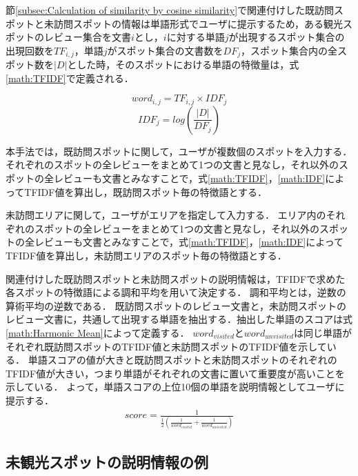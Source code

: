 \documentclass{deimj}
\begin{document}
節\ref{subsec:Calculation of similarity by cosine similarity}で関連付けした既訪問スポットと未訪問スポットの情報は単語形式でユーザに提示するため，ある観光スポットのレビュー集合を文書$i$とし，$i$に対する単語$j$が出現するスポット集合の出現回数を$TF_{i,j}$，単語$j$がスポット集合の文書数を$DF_{j}$，スポット集合内の全スポット数を$|D|$とした時，そのスポットにおける単語の特徴量は，式\ref{math:TFIDF}で定義される．

\begin{equation}
  word_{i,j} = TF_{i,j} \times IDF_{j}
  \label{math:TFIDF}
\end{equation}
\begin{equation}
  IDF_{j} = log(\frac{|D|}{DF_{j}})
  \label{math:IDF}
\end{equation}

本手法では，既訪問スポットに関して，ユーザが複数個のスポットを入力する．
それぞれのスポットの全レビューをまとめて1つの文書と見なし，それ以外のスポットの全レビューも文書とみなすことで，式\ref{math:TFIDF}，\ref{math:IDF}によってTFIDF値を算出し，既訪問スポット毎の特徴語とする．

未訪問エリアに関して，ユーザがエリアを指定して入力する．
エリア内のそれぞれのスポットの全レビューをまとめて1つの文書と見なし，それ以外のスポットの全レビューも文書とみなすことで，式\ref{math:TFIDF}，\ref{math:IDF}によってTFIDF値を算出し，未訪問エリアのスポット毎の特徴語とする．

関連付けした既訪問スポットと未訪問スポットの説明情報は，TFIDFで求めた各スポットの特徴語による調和平均を用いて決定する．
調和平均とは，逆数の算術平均の逆数である．
既訪問スポットのレビュー文書と，未訪問スポットのレビュー文書に，共通して出現する単語を抽出する．抽出した単語のスコアは式\ref{math:Harmonic Mean}によって定義する．
$word_{visited}$と$word_{unvisited}$は同じ単語がそれぞれ既訪問スポットのTFIDF値と未訪問スポットのTFIDF値を示している．
単語スコアの値が大きと既訪問スポットと未訪問スポットのそれぞれのTFIDF値が大きい，つまり単語がそれぞれの文書に置いて重要度が高いことを示している．
よって，単語スコアの上位10個の単語を説明情報としてユーザに提示する．
\begin{eqnarray}
  score=\frac{1}{\frac{1}{2}(\frac{1}{word_{visited}}+\frac{1}{word_{unvisited}})}
  \label{math:Harmonic Mean}
\end{eqnarray}

\subsection{未観光スポットの説明情報の例}
\label{subsec:Example of explained unfamiliar tourist spots}
\end{document}
